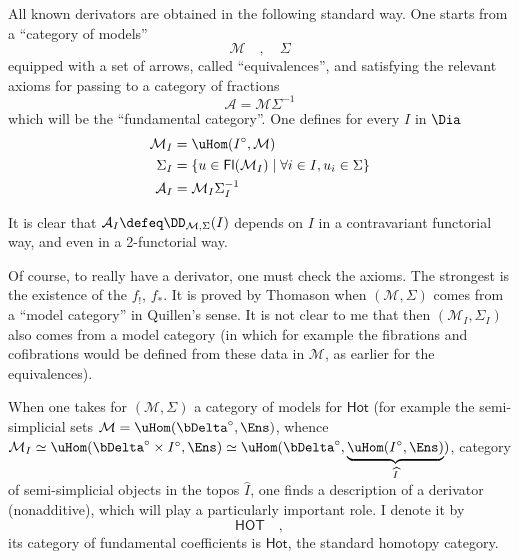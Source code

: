 All known derivators are obtained in the following standard way. One starts from a ``category of models''
\[
\mathcal{M} \quad , \quad \Sigma
\]
equipped with a set of arrows, called ``equivalences'', and satisfying the relevant axioms for passing to a category of fractions
\[
\mathcal{A} = \mathcal{M}\Sigma^{-1}
\]
which will be the ``fundamental category''. One defines for every $I$ in $\Dia$
\[
\begin{aligned}
\mathcal{M}_I &= \uHom(I^\circ,\mathcal{M}) \\
\Sigma_I &= \{u \in \mathsf{Fl}(\mathcal{M}_I) \mid \forall i \in I, u_i \in \Sigma\} \\
\mathcal{A}_I &= \mathcal{M}_I\Sigma_I^{-1}
\end{aligned}
\]

\noindent{}It is clear that $\mathcal{A}_I \defeq \DD_{\mathcal{M},\Sigma}(I)$ depends on $I$ in a contravariant functorial way, and even in a 2-functorial way.

Of course, to really have a derivator, one must check the axioms. The strongest is the existence of the $f_!$, $f_*$. It is proved by Thomason when $(\mathcal{M},\Sigma)$ comes from a ``model category'' in Quillen's sense. It is not clear to me that then $(\mathcal{M}_I,\Sigma_I)$ also comes from a model category (in which for example the fibrations %
and cofibrations would be defined from these data in $\mathcal{M}$, as earlier for the equivalences).

When one takes for $(\mathcal{M},\Sigma)$ a category of models for $\mathsf{Hot}$ (for example the semi-simplicial sets $\mathcal{M} = \uHom(\bDelta^\circ,\Ens)$, whence $\mathcal{M}_I \simeq \uHom(\bDelta^\circ \times I^\circ,\Ens) \simeq \uHom(\bDelta^\circ,\underbrace{\uHom(I^\circ,\Ens)}_{\widehat{I}})$, category of semi-simplicial objects in the topos $\widehat{I}$, one finds a description of a derivator (nonadditive), which will play a particularly important role. I denote it by %
\[
\mathsf{HOT} \quad ,
\]
its category of fundamental coefficients is $\mathsf{Hot}$, the standard homotopy category.

